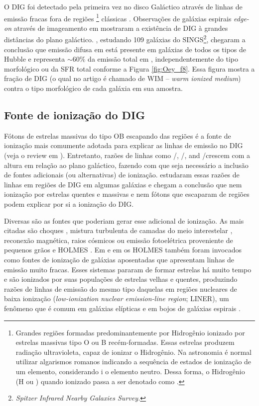 O DIG foi detectado pela primeira vez no disco Galáctico através de linhas de emissão fracas fora de regiões \hii\footnote{Grandes regiões formadas predominantemente por Hidrogênio ionizado por estrelas massivas tipo O ou B recém-formadas. Essas estrelas produzem radiação ultravioleta, capaz de ionizar o Hidrogênio. Na astronomia é normal utilizar algarismos romanos indicando a sequência de estados de ionização de um elemento, considerando {\sc i} o elemento neutro. Dessa forma, o Hidrogênio (H ou \hi) quando ionizado passa a ser denotado como \hii.} clássicas \citep{Reynolds.PhD.1971}. Observações de galáxias espirais {\em edge-on} através de imageamento em \Ha \citep{Dettmar.1990, HoopesWaltGreen.1996, HoopesWaltRand.1999} mostraram a existência de DIG à grandes distâncias do plano galáctico. \cite{Oey.etal.2007}, estudando 109 galáxias do SINGS\footnote{\em Spitzer Infrared Nearby Galaxies Survey.}, chegaram a conclusão que emissão difusa em \Ha está presente em galáxias de todos os tipos de Hubble e representa $\sim60\%$ da emissão total em \Ha, independentemente do tipo morfológico ou da SFR total conforme a Figura \ref{fig:Oey_f8}. Essa figura mostra a fração de DIG (o qual no artigo é chamado de WIM -- {\em warm ionized medium}) contra o tipo morfológico de cada galáxia em sua amostra.

\subsection{Fonte de ionização do DIG}
\label{sec:intro:DIG:source}
Fótons de estrelas massivas do tipo OB escapando das regiões \hii é a fonte de ionização mais comumente adotada para explicar as linhas de emissão no DIG (veja o review em \citealt{Haffner.etal.2009}). Entretanto, razões de linhas como \nii/\Ha, \sii/\Ha, and \oiii/\Hb crescem com a altura em relação ao plano galáctico, fazendo com que seja necessário a inclusão de fontes adicionais (ou alternativas) de ionização. \citet{HoopesWalt.2003} estudaram essas razões de linhas em regiões de DIG em algumas galáxias e chegam a conclusão que nem ionização por estrelas quentes e massivas e nem fótons que escaparam de regiões \hii podem explicar por si a ionização do DIG.

Diversas são as fontes que poderiam gerar esse adicional de ionização. As mais citadas são choques \citep{CollinsRand.2001}, mistura turbulenta de camadas do meio interestelar \citep{SlavinShullBegelman.1993, Binette.etal.2009a}, reconexão magnética, raios cósmicos ou emissão fotoelétrica proveniente de pequenos grãos \citep{Reynolds.etal.2001} e HOLMES \citep{FloresFajardo.etal.2011a}. Em \citet{Stasinska.etal.2008a} e em \citet{CidFernandes.etal.2011a} os HOLMES também foram invocados como fontes de ionização de galáxias aposentadas que apresentam linhas de emissão muito fracas. Esses sistemas pararam de formar estrelas há muito tempo e são ionizados por suas populações de estrelas velhas e quentes, produzindo razões de linhas de emissão do mesmo tipo daquelas em regiões nucleares de baixa ionização ({\em low-ionization nuclear emission-line region}; LINER), um fenômeno que é comum em galáxias elípticas e em bojos de galáxias espirais \citep{Sarzi.etal.2010, Gomes.etal.2016a, Belfiore.etal.2016}.

